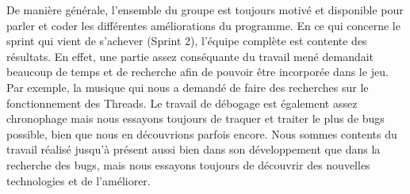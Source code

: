 De manière générale, l'ensemble du groupe est toujours motivé et disponible pour parler et coder les différentes améliorations du programme.
En ce qui concerne le sprint qui vient de s'achever (Sprint 2), l'équipe complète est contente des résultats.
En effet, une partie assez conséquante du travail mené demandait beaucoup de temps et de recherche afin de pouvoir être incorporée dans le jeu.
Par exemple, la musique qui nous a demandé de faire des recherches sur le fonctionnement des Threads.
Le travail de débogage est également assez chronophage mais nous essayons toujours de traquer et traiter le plus de bugs possible, bien que nous en découvrions parfois encore.
Nous sommes contents du travail réalisé jusqu'à présent aussi bien dans son développement que dans la recherche des bugs, mais nous essayons toujours de découvrir des nouvelles technologies et de l'améliorer.
